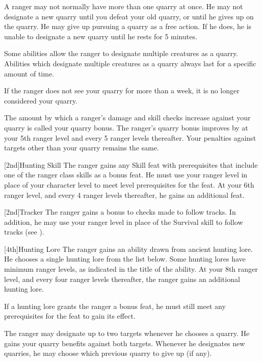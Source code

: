         A ranger may not normally have more than one quarry at once.
        He may not designate a new quarry until you defeat your old quarry, or until he gives up on the quarry.
        He may give up pursuing a quarry as a free action.
        If he does, he is unable to designate a new quarry until he rests for 5 minutes.

        Some abilities allow the ranger to designate multiple creatures as a quarry.
        Abilities which designate multiple creatures as a quarry always last for a specific amount of time.

        If the ranger does not see your quarry for more than a week, it is no longer considered your quarry.

        The amount by which a ranger's damage and skill checks increase against your quarry is called your quarry bonus.
        The ranger's quarry bonus improves by  at your 5th ranger level and every 5 ranger levels thereafter.
        Your penalties against targets other than your quarry remains the same.

        [2nd]{Hunting Skill}
        The ranger gains any Skill feat with prerequisites that include one of the ranger class skills as a bonus feat.
        He must use your ranger level in place of your character level to meet level prerequisites for the feat.
        At your 6th ranger level, and every 4 ranger levels thereafter, he gains an additional feat.

        [2nd]{Tracker}
        The ranger gains a  bonus to checks made to follow tracks.
        In addition, he may use your ranger level in place of the Survival skill to follow tracks (see ).

        [4th]{Hunting Lore}
        The ranger gains an ability drawn from ancient hunting lore.
        He chooses a single hunting lore from the list below.
        Some hunting lores have minimum ranger levels, as indicated in the title of the ability.
        At your 8th ranger level, and every four ranger levels thereafter, the ranger gains an additional hunting lore.

        If a hunting lore grants the ranger a bonus feat, he must still meet any prerequisites for the feat to gain its effect.

        The ranger may designate up to two targets whenever he chooses a quarry.
        He gains your quarry benefits against both targets.
        Whenever he designates new quarries, he may choose which previous quarry to give up (if any).

